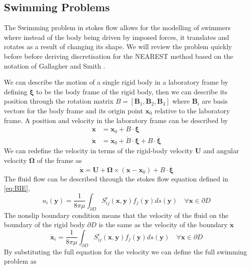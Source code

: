 \FloatBarrier
\subsection{Swimming Problems} \label{sec:swimming}
The Swimming problem in stokes flow allows for the modelling of swimmers where instead of the body being driven by imposed forces, it translates and rotates as a result of changing its shape. We will review the problem quickly before before deriving discretisation for the NEAREST method based on the notation of Gallagher and Smith \cite{Gallagher2018MeshfreeCells}.

We can describe the motion of a single rigid body in a laboratory frame by defining $\bm{\xi}$ to be the body frame of the rigid body, then we can describe its position through the rotation matrix $B = [\bm{B}_1,\bm{B}_2,\bm{B}_3]$ where $\bm{B}_i$ are basis vectors for the body frame and its origin point $\bm{x}_0$ relative to the laboratory frame. A position and velocity in the laboratory frame can be described by
\begin{equation*}
\begin{aligned}
    \bm{x} &= \bm{x}_0 + B\cdot\bm{\xi} \\
    \dot{\bm{x}} &= \dot{\bm{x}}_0 + \dot{B}\cdot\bm{\xi} + B\cdot\dot{\bm{\xi}}
\end{aligned}
\end{equation*}
We can redefine the velocity in terms of the rigid-body velocity $\bm{U}$ and angular velocity $\bm{\Omega}$ of the frame as
\begin{equation*}
    \dot{\bm{x}} = \bm{U} + \bm{\Omega}\times (\bm{x}-\bm{x}_0) + B\cdot\dot{\bm{\xi}}
\end{equation*}
The fluid flow can be described through the stokes flow equation defined in \cref{eq:BIE},
\begin{equation*}
    u_i(\bm{y}) = \frac{1}{8 \pi \mu} \int_{\partial D} S_{i j}^{\epsilon}\left(\bm{x}, \bm{y}\right) f_{j}(\bm{y}) d s(\bm{y}) \quad \forall \bm{x}\in\partial D
\end{equation*}
The nonslip boundary condition means that the velocity of the fluid on the boundary of the rigid body $\partial D$ is the same as the velocity of the boundary $\dot{\bm{x}}$
\begin{equation*}
    \dot{\bm{x}}_i = \frac{1}{8 \pi \mu} \int_{\partial D} S_{i j}^{\epsilon}\left(\bm{x}, \bm{y}\right) f_{j}(\bm{y}) d s(\bm{y}) \quad \forall \bm{x}\in\partial D
\end{equation*}
By substituting the full equation for the velocity we can define the full swimming problem as

